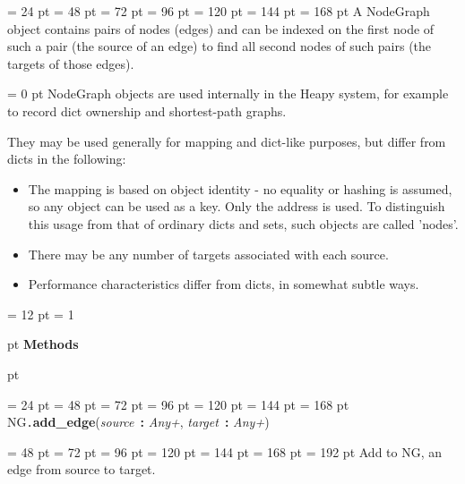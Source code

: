 {{{} \noindent
\par}
{\par \noindent  \leftskip = 24 pt  \leftmargini = 48 pt  \leftmarginii = 72 pt  \leftmarginiii = 96 pt  \leftmarginiv = 120 pt  \leftmarginv = 144 pt  \leftmarginvi = 168 pt A NodeGraph object contains pairs of nodes (edges) and can be indexed
on the first node of such a pair (the source of an edge) to find all
second nodes of such pairs (the targets of those edges).{\par \parindent = 0 pt 
NodeGraph objects are used internally in the Heapy system, for example
to record dict ownership and shortest-path graphs. \par}
{\par 
They may be used generally for mapping and dict-like purposes, but
differ from dicts in the following: \par}
\begin{itemize}
\item  The mapping is based on object identity - no equality or hashing is
  assumed, so any object can be used as a key. Only the address is used.
  To distinguish this usage from that of ordinary dicts and sets, such
  objects are called 'nodes'.\item  There may be any number of targets associated with each source.\item  Performance characteristics differ from dicts, in somewhat subtle ways.
\end{itemize}
\par}
{\par \pagebreak[3.300000] \noindent \hangindent = 12 pt \hangafter = 1 
{\par \pagebreak[3]  pt \noindent
{\Large {\bf Methods\/}}\par {} pt
} \noindent
\par}
{\par \noindent  \leftskip = 24 pt  \leftmargini = 48 pt  \leftmarginii = 72 pt  \leftmarginiii = 96 pt  \leftmarginiv = 120 pt  \leftmarginv = 144 pt  \leftmarginvi = 168 pt NG{\tt .\/}{\bf {\large {\bf add{\_}edge\/}}\/}({\em source\/}~{\bf :}  {\em Any+\/}, {\em target\/}~{\bf :}  {\em Any+\/}){\par \noindent
{\par \noindent  \leftskip = 48 pt  \leftmargini = 72 pt  \leftmarginii = 96 pt  \leftmarginiii = 120 pt  \leftmarginiv = 144 pt  \leftmarginv = 168 pt  \leftmarginvi = 192 pt  Add to NG, an edge from source to target.\par}
}}}
